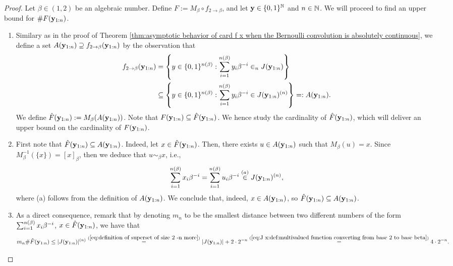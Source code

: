 \begin{proof}
    Let $\beta \in (1,2)$ be an algebraic number. Define $F :=  M_\beta \circ f_{2 \to \beta}$, and let ${\bf y} \in \{0,1\}^{\mathbb{N}}$ and $n \in \mathbb{N}$. We will proceed to find an upper bound for $\# F({\bf y}_{1:n})$. 
    \begin{enumerate}[label=(\alph*)]
        \item Similary as in the proof of Theorem \ref{thm:asymptotic behavior of card f x when the Bernoulli convolution is absolutely continuous}, we define a set $A({\bf y}_{1:n}) \supseteq f_{2 \to \beta}({\bf y}_{1:n})$ by the observation that
        \begin{align}
            f_{2 \to \beta}({\bf y}_{1:n}) &=  \left\{ y \in \{0,1\}^{n(\beta)} :  \sum_{i=1}^{n(\beta)} y_i \beta^{-i} \in_{n} J({\bf y}_{1:n})\right\}\\
            &\subseteq \left\{ y \in \{0,1\}^{n(\beta)} :  \sum_{i=1}^{n(\beta)} y_i \beta^{-i} \in J({\bf y}_{1:n})^{(n)}\right\} =: A({\bf y}_{1:n}).
        \end{align}
        We define $\hat F({\bf y}_{1:n}) := M_\beta(A({\bf y}_{1:n}))$. Note that $F({\bf y}_{1:n}) \subseteq \hat F({\bf y}_{1:n})$. We hence study the cardinality of $\hat F({\bf y}_{1:n})$, which will deliver an upper bound on the cardinality of $F({\bf y}_{1:n})$.
        \item First note that $\hat F({\bf y}_{1:n}) \subseteq A({\bf y}_{1:n})$. Indeed, let $x \in \hat F({\bf y}_{1:n})$. Then, there exists $u \in A({\bf y}_{1:n})$ such that $M_\beta(u) = x$. Since $M_\beta^{-1}(\{x\}) = [x]_\beta$, then we deduce that $u \sim_\beta x$, i.e.,
        \begin{equation}\label{eq:0:proof:cor:upper bound on the relative compressibility of beta expansions for algebraic beta}
            \sum_{i=1}^{n(\beta)} x_i \beta^{-i} = \sum_{i=1}^{n(\beta)} u_i \beta^{-i} \overset{(a)}{\in} J({\bf y}_{1:n})^{(n)},
        \end{equation}
        where (a) follows from the definition of $A({\bf y}_{1:n})$. We conclude that, indeed, $x \in A({\bf y}_{1:n})$, so $\hat F({\bf y}_{1:n}) \subseteq A({\bf y}_{1:n})$.
        \item As a direct consequence, remark that by denoting $m_n$ to be the smallest distance between two different numbers of the form $\sum_{i=1}^{n(\beta)} x_i \beta^{-i}$, $x \in \hat F({\bf y}_{1:n})$, we have that 
        \begin{equation}\label{eq:1:proof:cor:upper bound on the relative compressibility of beta expansions for algebraic beta}
           m_n \#\hat  F(\yf_{1:n}) \leq |J(\yf_{1:n})|^{(n)} \overset{(\ref{eq:definition of superset of size 2 -n more})}{=} |J(\yf_{1:n})| + 2\cdot 2^{-n} \overset{(\ref{eq:J x:def:multivalued function converting from base 2 to base beta})}{=} 4 \cdot 2^{-n}.

\end{equation}
\end{enumerate}
\end{proof}

